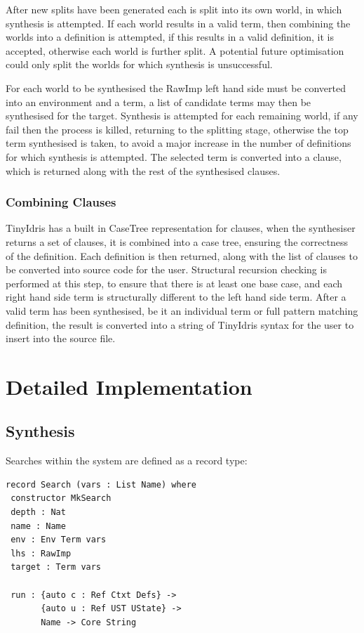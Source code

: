 \documentclass[a4paper]{article}
\begin{document}
After new splits have been generated each is split
into its own world, in which synthesis is attempted. If each world results 
in a valid term, then combining the worlds into a definition is attempted, if this
results in a valid definition, it is accepted, otherwise each world is further
split. A potential future optimisation could only split the worlds for which synthesis is
unsuccessful.

For each world to be synthesised the RawImp left hand side must be 
converted into an environment and a term, a list of candidate terms may then be 
synthesised for the target. Synthesis is attempted for each remaining world, 
if any fail then the process is killed, returning to the splitting stage, otherwise the top term synthesised
is taken, to avoid a major increase in the number of definitions for which synthesis is attempted.
The selected term is converted into a clause, which is returned along with the rest of the synthesised clauses.

\subsubsection{Combining Clauses}
\label{sec:org909acde}
TinyIdris has a built in CaseTree representation for clauses, when the synthesiser
returns a set of clauses, it is combined into a case tree, ensuring the correctness
of the definition. Each definition is then returned, along with the list of clauses
to be converted into source code for the user. Structural recursion
checking is performed at this step, to ensure that there is at least one base case, and each right hand side term is structurally different to the left hand side term. 
After a valid term has been synthesised, be it an individual term or
full pattern matching definition, the result is converted into a string of TinyIdris syntax for
the user to insert into the source file. 

\clearpage

\section{Detailed Implementation}

\subsection{Synthesis}
Searches within the system are defined as a record type:

\begin{center}
  \begin{verbatim}
record Search (vars : List Name) where
 constructor MkSearch
 depth : Nat
 name : Name
 env : Env Term vars
 lhs : RawImp
 target : Term vars 

 run : {auto c : Ref Ctxt Defs} -> 
       {auto u : Ref UST UState} ->
       Name -> Core String
  \end{verbatim}
\end{center}
\end{document}
